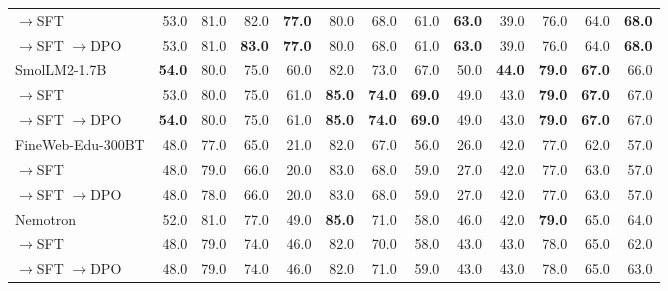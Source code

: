 \begin{table}[htbp]
{\begin{tabular}{lrrrrrrrrrrrr}
\quad $\to$SFT & 53.0 & 81.0 & 82.0 & \textbf{77.0} & 80.0 & 68.0 & 61.0 & \textbf{63.0} & 39.0 & 76.0 & 64.0 & \textbf{68.0} \\
\quad $\to$SFT $\to$DPO & 53.0 & 81.0 & \textbf{83.0} & \textbf{77.0} & 80.0 & 68.0 & 61.0 & \textbf{63.0} & 39.0 & 76.0 & 64.0 & \textbf{68.0} \\
\midrule
\addlinespace[0.3em]
SmolLM2-1.7B       & \textbf{54.0} & 80.0 & 75.0 & 60.0 & 82.0 & 73.0 & 67.0 & 50.0 & \textbf{44.0} & \textbf{79.0} & \textbf{67.0} & 66.0 \\
\quad $\to$SFT & 53.0 & 80.0 & 75.0 & 61.0 & \textbf{85.0} & \textbf{74.0} & \textbf{69.0} & 49.0 & 43.0 & \textbf{79.0} & \textbf{67.0} & 67.0 \\
\quad $\to$SFT $\to$DPO & \textbf{54.0} & 80.0 & 75.0 & 61.0 & \textbf{85.0} & \textbf{74.0} & \textbf{69.0} & 49.0 & 43.0 & \textbf{79.0} & \textbf{67.0} & 67.0 \\
\midrule
\addlinespace[0.3em]
FineWeb-Edu-300BT & 48.0 & 77.0 & 65.0 & 21.0 & 82.0 & 67.0 & 56.0 & 26.0 & 42.0 & 77.0 & 62.0 & 57.0 \\
\quad $\to$SFT & 48.0 & 79.0 & 66.0 & 20.0 & 83.0 & 68.0 & 59.0 & 27.0 & 42.0 & 77.0 & 63.0 & 57.0 \\
\quad $\to$SFT $\to$DPO & 48.0 & 78.0 & 66.0 & 20.0 & 83.0 & 68.0 & 59.0 & 27.0 & 42.0 & 77.0 & 63.0 & 57.0 \\
\midrule
\addlinespace[0.3em]
Nemotron       & 52.0 & 81.0 & 77.0 & 49.0 & \textbf{85.0} & 71.0 & 58.0 & 46.0 & 42.0 & \textbf{79.0} & 65.0 & 64.0 \\
\quad $\to$SFT & 48.0 & 79.0 & 74.0 & 46.0 & 82.0 & 70.0 & 58.0 & 43.0 & 43.0 & 78.0 & 65.0 & 62.0 \\
\quad $\to$SFT $\to$DPO & 48.0 & 79.0 & 74.0 & 46.0 & 82.0 & 71.0 & 59.0 & 43.0 & 43.0 & 78.0 & 65.0 & 63.0 \\
\midrule
\bottomrule
\end{tabular}%
}
\end{table}


